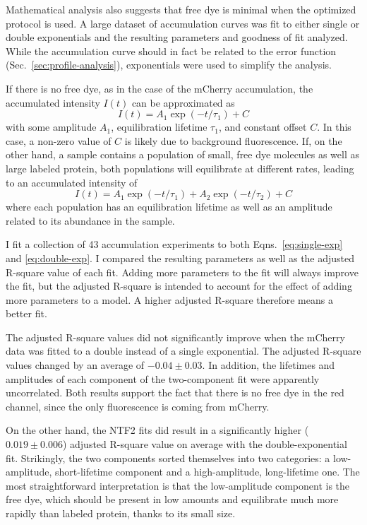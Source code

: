 Mathematical analysis also suggests that free dye is minimal when the optimized protocol is used.  A large dataset of accumulation curves was fit to either single or double exponentials and the resulting parameters and goodness of fit analyzed.  While the accumulation curve should in fact be related to the error function (Sec.~\ref{sec:profile-analysis}), exponentials were used to simplify the analysis.

If there is no free dye, as in the case of the mCherry accumulation, the accumulated intensity $I(t)$ can be approximated as
\begin{equation}
I(t) = A_1\exp(-t/\tau_1) +C
\label{eq:single-exp}
\end{equation}
with some amplitude $A_1$, equilibration lifetime $\tau_1$, and constant offset $C$.  In this case, a non-zero value of $C$ is likely due to background fluorescence.  If, on the other hand, a sample contains a population of small, free dye molecules as well as large labeled protein, both populations will equilibrate at different rates, leading to an accumulated intensity of
\begin{equation}
I(t) = A_1\exp(-t/\tau_1) + A_2\exp(-t/\tau_2)+C
\label{eq:double-exp}
\end{equation}
where each population has an equilibration lifetime as well as an amplitude related to its abundance in the sample.

I fit a collection of 43 accumulation experiments to both Eqns.~\ref{eq:single-exp} and \ref{eq:double-exp}.  I compared the resulting parameters as well as the adjusted R-square value of each fit.  Adding more parameters to the fit will always improve the fit, but the adjusted R-square is intended to account for the effect of adding more parameters to a model.  A higher adjusted R-square therefore means a better fit.

The adjusted R-square values did not significantly improve when the mCherry data was fitted to a double instead of a single exponential.  The adjusted R-square values changed by an average of $-0.04\pm0.03$.  In addition, the lifetimes and amplitudes of each component of the two-component fit were apparently uncorrelated.  Both results support the fact that there is no free dye in the red channel, since the only fluorescence is coming from mCherry.

On the other hand, the NTF2 fits did result in a significantly higher ($0.019\pm0.006$) adjusted R-square value on average with the double-exponential fit.  Strikingly, the two components sorted themselves into two categories: a low-amplitude, short-lifetime component and a high-amplitude, long-lifetime one.  The most straightforward interpretation is that the low-amplitude component is the free dye, which should be present in  low amounts and equilibrate much more rapidly than labeled protein, thanks to its small size.

